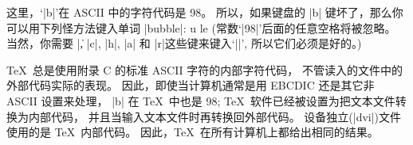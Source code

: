 这里，`|b|'在 ASCII 中的字符代码是 98。%
所以，如果键盘的 |b| 键坏了，那么你可以用下列怪方法键入单词 |bubble|:
\begintt
{} u le
\endtt
(常数`|98|'后面的任意空格将被忽略。
当然，你需要 |\|, |c|, |h|, |a| 和 |r|这些键来键入`|\char|',
所以它们必须是好的。)

\danger \TeX\ 总是使用附录 C 的标准 ASCII 字符的内部字符代码，
不管读入的文件中的外部代码实际的表\hbox{现。}%
因此，即使当计算机通常是用 EBCDIC 还是其它非 ASCII 设置来处理，
|b| 在 \TeX\ 中也是 98; \TeX\ 软件已经被设置为把文本文件转换为内部代码，
并且当输入文本文件时再转换回外部代码。%
设备独立(|dvi|)文件使用的是 \TeX\ 内部代码。%
因此，\TeX\ 在所有计算机上都给出相同的结果。

